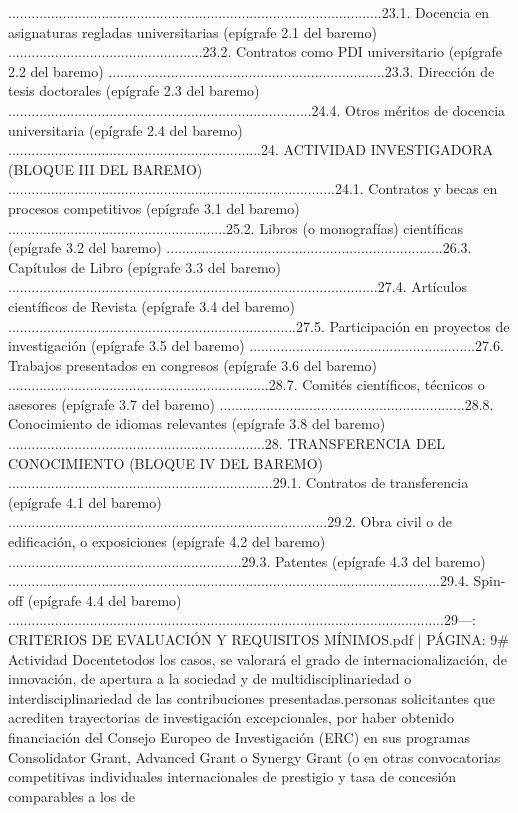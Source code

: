 \documentclass{article}
\begin{document}
\begin{itemize}
{{................................................................................................23.1. Docencia en asignaturas regladas universitarias (epígrafe 2.1 del baremo) ..................................................23.2. Contratos como PDI universitario (epígrafe 2.2 del baremo) .......................................................................23.3. Dirección de tesis doctorales (epígrafe 2.3 del baremo) ..............................................................................24.4. Otros méritos de docencia universitaria (epígrafe 2.4 del baremo) .................................................................24. ACTIVIDAD INVESTIGADORA (BLOQUE III DEL BAREMO) ....................................................................................24.1. Contratos y becas en procesos competitivos (epígrafe 3.1 del baremo) ........................................................25.2. Libros (o monografías) científicas (epígrafe 3.2 del baremo) .......................................................................26.3. Capítulos de Libro (epígrafe 3.3 del baremo) ...............................................................................................27.4. Artículos científicos de Revista (epígrafe 3.4 del baremo) ..........................................................................27.5. Participación en proyectos de investigación (epígrafe 3.5 del baremo) ..........................................................27.6. Trabajos presentados en congresos (epígrafe 3.6 del baremo) ...................................................................28.7. Comités científicos, técnicos o asesores (epígrafe 3.7 del baremo) ...............................................................28.8. Conocimiento de idiomas relevantes (epígrafe 3.8 del baremo) ..................................................................28. TRANSFERENCIA DEL CONOCIMIENTO (BLOQUE IV DEL BAREMO) ....................................................................29.1. Contratos de transferencia (epígrafe 4.1 del baremo) ..................................................................................29.2. Obra civil o de edificación, o exposiciones (epígrafe 4.2 del baremo) ............................................................29.3. Patentes (epígrafe 4.3 del baremo) ...............................................................................................................29.4. Spin-off (epígrafe 4.4 del baremo) ................................................................................................................29\n\n---\n\nFUENTE: CRITERIOS DE EVALUACIÓN Y REQUISITOS MÍNIMOS.pdf | PÁGINA: 9\n# Actividad Docente\n\nEn todos los casos, se valorará el grado de internacionalización, de innovación, de apertura a la sociedad y de multidisciplinariedad o interdisciplinariedad de las contribuciones presentadas.\n\nLas personas solicitantes que acrediten trayectorias de investigación excepcionales, por haber obtenido financiación del Consejo Europeo de Investigación (ERC) en sus programas Consolidator Grant, Advanced Grant o Synergy Grant (o en otras convocatorias competitivas individuales internacionales de prestigio y tasa de concesión comparables a los de }}
\end{itemize}
\end{document}
